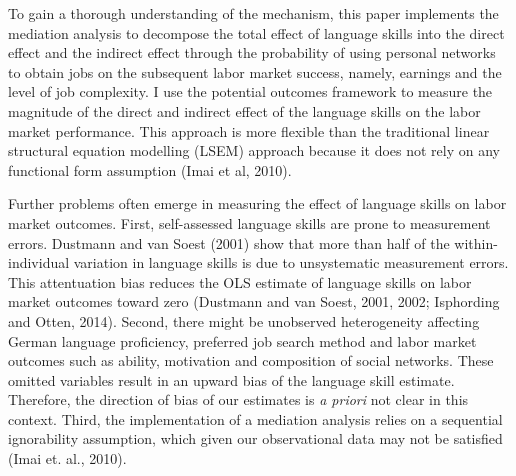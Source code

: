 \documentclass[12pt,a4paper]{article}
\begin{document}
To gain a thorough understanding of the mechanism, this paper implements the mediation analysis to decompose the total effect of language skills into the direct effect and the indirect effect through the probability of using personal networks to obtain jobs on the subsequent labor market success, namely, earnings and the level of job complexity. I use the potential outcomes framework to measure the magnitude of the direct and indirect effect of the language skills on the labor market performance. This approach is more flexible than the traditional linear structural equation modelling (LSEM) approach because it does not rely on any functional form assumption (Imai et al, 2010).


Further problems often emerge in measuring the effect of language skills on labor market outcomes. First, self-assessed language skills are prone to measurement errors. Dustmann and van Soest (2001) show that more than half of the within-individual variation in language skills is due to unsystematic measurement errors. This attentuation bias reduces the OLS estimate of language skills on labor market outcomes toward zero (Dustmann and van Soest, 2001, 2002; Isphording and Otten, 2014). Second, there might be unobserved heterogeneity affecting German language proficiency, preferred job search method and labor market outcomes such as ability, motivation and composition of social networks. These omitted variables result in an upward bias of the language skill estimate. Therefore, the direction of bias of our estimates is \textit{a priori} not clear in this context. Third, the implementation of a mediation analysis relies on a sequential ignorability assumption, which given our observational data may not be satisfied (Imai et. al., 2010). 
\end{document}
